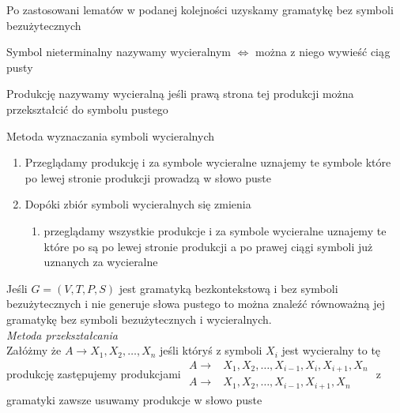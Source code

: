 	\begin{tw}
		Po zastosowani lematów w podanej kolejności uzyskamy gramatykę bez symboli bezużytecznych
	\end{tw}
	
	\begin{df}
		Symbol nieterminalny nazywamy wycieralnym $\Leftrightarrow$ można z niego wywieść ciąg pusty
	\end{df}		

	\begin{df}
		Produkcję nazywamy wycieralną jeśli prawą strona tej produkcji można przekształcić do symbolu pustego
	\end{df}			
	
	\begin{df}Metoda wyznaczania symboli wycieralnych\\
		\begin{enumerate}
			\item Przeglądamy produkcję i za symbole wycieralne uznajemy te symbole które po lewej stronie produkcji 
			prowadzą w słowo puste
			\item Dopóki zbiór symboli wycieralnych się zmienia
			\begin{enumerate}
				\item przeglądamy wszystkie produkcje i za symbole wycieralne uznajemy te które po są po lewej stronie
				produkcji a po prawej ciągi symboli już uznanych za wycieralne
			\end{enumerate}
		\end{enumerate}
	\end{df}
	
	\begin{df}
		Jeśli $G = (V, T, P, S)$ jest gramatyką bezkontekstową i bez symboli bezużytecznych i nie generuje słowa pustego
		to można znaleźć równoważną jej gramatykę bez symboli bezużytecznych i wycieralnych.\\
		\emph{Metoda przekształcania}\\
		Załóżmy że $A \to X_1,X_2,\dots,X_n$ jeśli któryś z symboli $X_i$ jest wycieralny to tę produkcję zastępujemy produkcjami
		$\begin{matrix}
			A \to& X_1,X_2,\dots,X_{i-1},X_i,X_{i+1},X_n \\ A \to& X_1,X_2,\dots,X_{i-1},X_{i+1},X_n
		\end{matrix}$
		z gramatyki zawsze usuwamy produkcje w słowo puste
	\end{df}	
